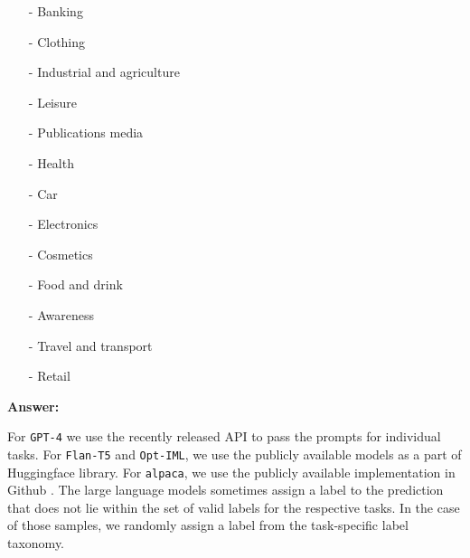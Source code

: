 \begin{itemize}
\begin{itemize}
    \item [-] Banking 
    \item [-] Clothing 
    \item [-] Industrial and agriculture 
    \item [-] Leisure 
    \item [-] Publications media 
    \item [-] Health 
    \item [-] Car 
    \item [-] Electronics 
    \item [-] Cosmetics 
    \item [-] Food and drink 
    \item [-] Awareness 
    \item [-] Travel and transport 
    \item [-] Retail 
\end{itemize}
\textbf{Answer:}
\end{itemize}
For \texttt{GPT-4} we use the recently released API to pass the prompts for individual tasks.
For \texttt{Flan-T5} and \texttt{Opt-IML}, we use the publicly available models as a part of Huggingface \cite{wolf-etal-2020-transformers} library. For \texttt{alpaca}, we use the publicly available implementation in Github \cite{alpaca}. The large language models sometimes assign a label to the prediction that does not lie within the set of valid labels for the respective tasks. In the case of those samples, we randomly assign a label from the task-specific label taxonomy. 
